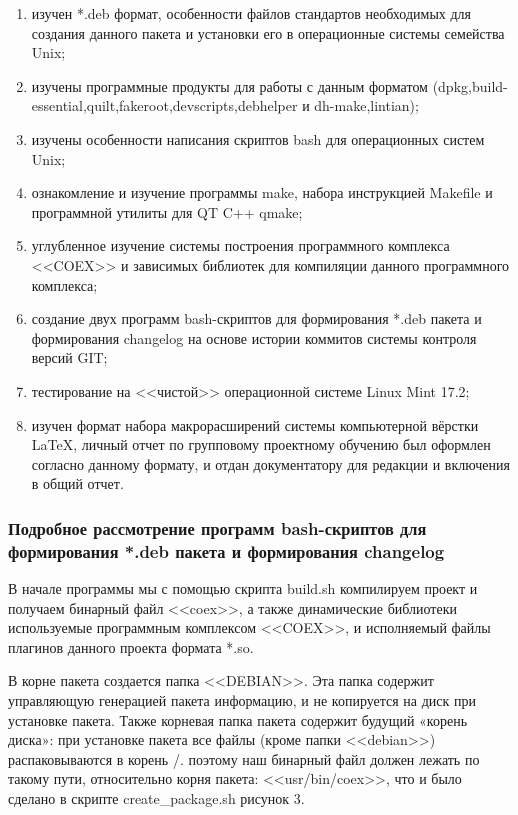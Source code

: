 \begin{enumerate}
\item изучен *.deb формат, особенности файлов стандартов необходимых для создания данного пакета и установки его в операционные системы семейства Unix; 
\item изучены программные продукты для работы с данным форматом (dpkg,build-essential,quilt,fakeroot,devscripts,debhelper и dh-make,lintian);
\item изучены особенности написания скриптов bash для операционных систем Unix;
\item ознакомление и изучение программы make, набора инструкцией Makefile и программной утилиты для QT C++ qmake;
\item углубленное изучение системы построения программного комплекса <<COEX>> и зависимых библиотек для компиляции данного программного комплекса;
\item создание двух программ bash-скриптов для формирования *.deb пакета и формирования changelog на основе истории коммитов системы контроля версий GIT;
\item тестирование на <<чистой>> операционной системе Linux Mint 17.2;
\item изучен формат набора макрорасширений системы компьютерной вёрстки LaTeX, личный отчет по групповому проектному обучению был оформлен согласно данному формату, и отдан документатору для редакции и включения в общий отчет.
\end{enumerate}

\subsubsection{ Подробное рассмотрение программ bash-скриптов для формирования *.deb пакета и формирования changelog}

В начале программы мы с помощью скрипта build.sh компилируем проект и получаем бинарный файл <<coex>>, а также динамические библиотеки используемые программным комплексом <<COEX>>, и исполняемый файлы плагинов данного проекта формата *.so. 

В корне пакета создается папка <<DEBIAN>>. Эта папка содержит управляющую генерацией пакета информацию, и не копируется на диск при установке пакета.
Также корневая папка пакета содержит будущий «корень диска»: при установке пакета все файлы (кроме папки <<debian>>) распаковываются в корень /. поэтому наш бинарный файл должен лежать по такому пути, относительно корня пакета: <<usr/bin/coex>>, что и было сделано в скрипте create\_package.sh рисунок 3. 

